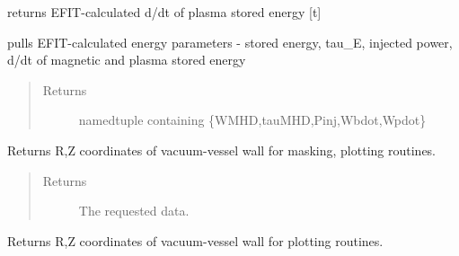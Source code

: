\documentclass[letterpaper,10pt,english]{sphinxmanual}
\begin{document}
\begin{fulllineitems}

\begin{fulllineitems}
\label{eqtools:eqtools.EFIT.EFITTree.getWpdot}
returns EFIT-calculated d/dt of plasma stored energy {[}t{]}

\end{fulllineitems}


\begin{fulllineitems}
\label{eqtools:eqtools.EFIT.EFITTree.getEnergy}
pulls EFIT-calculated energy parameters - stored energy, tau\_E, injected power, d/dt of magnetic and plasma stored energy
\begin{quote}\begin{description}
\item[{Returns}] \leavevmode
namedtuple containing \{WMHD,tauMHD,Pinj,Wbdot,Wpdot\}

\end{description}\end{quote}

\end{fulllineitems}


\begin{fulllineitems}
\label{eqtools:eqtools.EFIT.EFITTree.getMachineCrossSection}
Returns R,Z coordinates of vacuum-vessel wall for masking, plotting routines.
\begin{quote}\begin{description}
\item[{Returns}] \leavevmode
The requested data.

\end{description}\end{quote}

\end{fulllineitems}


\begin{fulllineitems}
\label{eqtools:eqtools.EFIT.EFITTree.getMachineCrossSectionFull}
Returns R,Z coordinates of vacuum-vessel wall for plotting routines.


\end{fulllineitems}
\end{fulllineitems}
\end{document}

